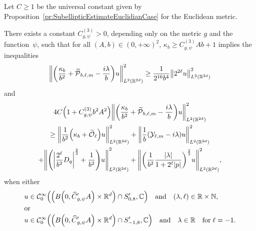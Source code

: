 \documentclass[10pt]{amsart}
\theoremstyle{definition}\newtheorem{defi}[theo]{Definition}\newtheorem{rema}[theo]{Remark}\newtheorem{exam}[theo]{Example}\newtheorem{exem}[theo]{Example}\newtheorem{nota}[theo]{Notation}
\newcommand{\C}{\mathbb{C}}
\newcommand{\R}{\mathbb{R}}
\newcommand{\N}{\mathbb{N}}
\newcommand{\clC}{\mathcal{C}}
\newcommand{\clY}{\mathcal{Y}}
\newcommand{\clO}{\mathcal{O}}
\newcommand{\clP}{\mathcal{P}}
\let\oldtilde\tilde
\renewcommand*{\tilde}[1]{\mathchoice{\widetilde{#1}}{\widetilde{#1}}{\oldtilde{#1}}{\oldtilde{#1}}}
\let\oldhat\hat
\renewcommand*{\hat}[1]{\mathchoice{\widehat{#1}}{\widehat{#1}}{\oldhat{#1}}{\oldhat{#1}}}
\let\originalleft\left
\let\originalright\right
\renewcommand{\left}{\mathopen{}\mathclose\bgroup\originalleft}
\renewcommand{\right}{\aftergroup\egroup\originalright}
\begin{document}
\begin{prop}\label{pr:LowerBoundInLocalizedGeneralCase}
Let $C\geq 1$ be the universal constant given by Proposition~\ref{pr:SubellipticEstimateEuclidianCase} for the Euclidean metric.

There exists a constant $C_{g,\psi}^{(3)}>0$, depending only on the metric $g$ and the function~$\psi$, such that for all $(A,b)\in (0,+\infty)^2$, $\kappa_b \geq C_{g,\psi}^{(3)}Ab+1$ implies the inequalities
\begin{equation}\label{pr:LowerBoundInLocalizedGeneralCaseIPP}
\left\| \left(\frac{\kappa_{b}}{b^{2}} + \tilde{\clP}_{b,\ell,m} - \frac{i\lambda}{b} \right) u \right\|_{L^2(\R^{2d})}^{2} \geq \frac{1}{2^{16}b^4}\left\|2^{2\ell} u\right\|_{L^2(\R^{2d})}^2
\end{equation}
and
\begin{multline}\label{eq:subellipticEstimateInAlmostEuclideanCase}
4C\left(1 + C_{g,\psi}^{(3)}b^2A^2\right)\left\| \left(\frac{\kappa_{b}}{b^{2}} + \tilde{\clP}_{b,\ell,m} - \frac{i\lambda}{b} \right) u \right\|_{L^2(\R^{2d})}^{2}\\
\geq \left\| \frac{1}{b^2}\left(\kappa_b+\tilde{\clO}_{\ell}\right) u\right\|_{L^2(\R^{2d})}^2 + \left\| \frac{1}{b}\left(\clY_{\ell,m}-i \lambda \right)u \right\|_{L^2(\R^{2d})}^2
\\ + \left\| \left(\left|\frac{2^{\ell}}{b^2}D_{q} \right|^{\frac{2}{3}} + \frac{1}{b^2}\right) u \right\|_{L^2(\R^{2d})}^{2} + \left\| \left(\frac{1}{b^2} \frac{|\lambda|}{1+2^{\ell}|p|} \right)^{\frac{2}{3}} u \right\|_{L^2(\R^{2d})}^{2} ,
\end{multline}
when either
\begin{align*}
u &\in \clC^\infty_0\left(\left(B\left(0,\hat{C}'_{g,\psi}A\right)\times \R^d\right)\cap S_{0,8}',\C\right)\quad\text{and}\quad (\lambda,\ell)\in \R\times \N,\\
\intertext{or}
u &\in \clC^\infty_0\left(\left(B\left(0,\hat{C}'_{g,\psi}A\right)\times \R^d\right)\cap S_{-1,8}',\C\right)\quad \text{and}\quad \lambda\in \R\quad\text{for}\; \ell=-1.
\end{align*}
\end{prop}
\end{document}
